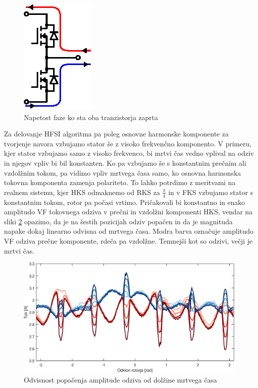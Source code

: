\documentclass[a4paper,twoside,openright,12pt,slovene]{book}
\begin{document}
\begin{figure}[!htbp]
    \centering
    \includegraphics[width=0.4\columnwidth]{Slike/Inkscape/mrtviCasRazlaga.eps}
    \caption{\label{mrtviCasRazlaga} Napetost faze ko sta oba tranzistorja zaprta}
\end{figure}

Za delovanje HFSI algoritma pa poleg osnovne harmonske komponente za tvorjenje navora vzbujamo stator še z visoko frekvenčno komponento. V primeru, kjer stator vzbujamo samo z visoko frekvenco, bi
mrtvi čas vedno vplival na odziv in njegov vpliv bi bil konstanten. Ko pa vzbujamo še s konstantnim prečnim ali vzdolžnim tokom, pa vidimo vpliv mrtvega časa samo, ko osnovna harmonska tokovna
komponenta zamenja polariteto. To lahko potrdimo z meritvami na realnem sistemu, kjer HKS odmaknemo od RKS za $\frac{\pi}{4}$ in v FKS vzbujamo stator s konstantnim tokom, rotor pa počasi vrtimo.
Pričakovali bi konstantno in enako amplitudo VF tokovnega odziva v prečni in vzdolžni komponenti HKS, vendar na sliki \ref{mrtviCas} opazimo, da je na šestih pozicijah odziv popačen in da je magnituda
napake dokaj linearno odvisna od mrtvega časa. Modra barva označuje amplitudo VF odziva prečne komponente, rdeča pa vzdolžne. Temnejši kot so odzivi, večji je mrtvi čas. 

\begin{figure}[!htbp]
    \centering
    \includegraphics[width=0.95\columnwidth]{Slike/mrtviCas.eps}
    \caption{\label{mrtviCas} Odvisnost popačenja amplitude odziva od dolžine mrtvega časa}
\end{figure}
\end{document}
